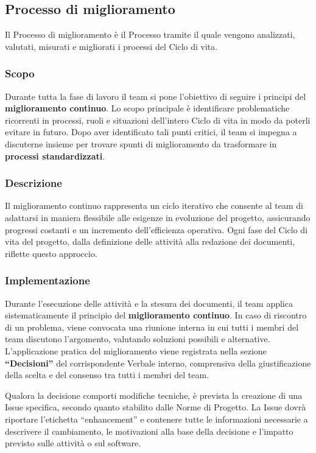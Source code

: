 \documentclass[a4paper,12pt]{article}
\begin{document}
\subsection{Processo di miglioramento} \label{sec:processo-miglioramento}
Il Processo di miglioramento è il Processo tramite il quale vengono analizzati, valutati, misurati e migliorati i processi del Ciclo di vita.

\subsubsection{Scopo}
Durante tutta la fase di lavoro il team si pone l'obiettivo di seguire i principi del \textbf{miglioramento continuo}. Lo scopo principale è identificare problematiche ricorrenti in processi, ruoli e situazioni dell'intero Ciclo di vita in modo da poterli evitare in futuro. Dopo aver identificato tali punti critici, il team si impegna a discuterne insieme per trovare spunti di miglioramento da trasformare in \textbf{processi standardizzati}. 

\subsubsection{Descrizione}
Il miglioramento continuo rappresenta un ciclo iterativo che consente al team di adattarsi in maniera flessibile alle esigenze in evoluzione del progetto, assicurando progressi costanti e un incremento dell’efficienza operativa. Ogni fase del Ciclo di vita del progetto, dalla definizione delle attività alla redazione dei documenti, riflette questo approccio.

\subsubsection{Implementazione}
Durante l’esecuzione delle attività e la stesura dei documenti, il team applica sistematicamente il principio del \textbf{miglioramento continuo}. In caso di riscontro di un problema, viene convocata una riunione interna in cui tutti i membri del team discutono l’argomento, valutando soluzioni possibili e alternative. L’applicazione pratica del miglioramento viene registrata nella sezione \textbf{“Decisioni”} del corrispondente Verbale interno, comprensiva della giustificazione della scelta e del consenso tra tutti i membri del team.

Qualora la decisione comporti modifiche tecniche, è prevista la creazione di una Issue specifica, secondo quanto stabilito dalle Norme di Progetto. La Issue dovrà riportare l’etichetta “enhancement” e contenere tutte le informazioni necessarie a descrivere il cambiamento, le motivazioni alla base della decisione e l’impatto previsto sulle attività o sul software.
\end{document}
